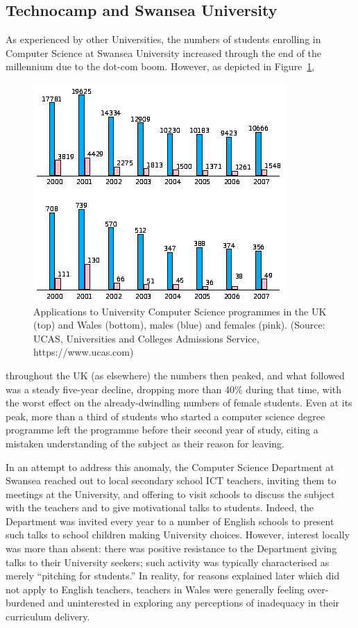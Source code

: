 \documentclass{sig-alternate}
\begin{document}
\subsection{Technocamp and Swansea University}
As experienced by other Universities,
the numbers of students enrolling in Computer Science
at Swansea University increased through the end
of the millennium due to the dot-com boom.
However, as depicted in Figure~\ref{fig:numbers},
\begin{figure}
  \centering
  \includegraphics[width=0.9\columnwidth]{images/numbers.png}
  \caption{Applications to University Computer Science programmes
           in the UK (top) and Wales (bottom), males (blue) and females (pink).
           (Source: UCAS, Universities and Colleges Admissions Service,
            https://www.ucas.com)}
  \label{fig:numbers}
\end{figure}
throughout the UK (as elsewhere) the numbers then peaked, and what followed
was a steady five-year decline, dropping more than 40\% during that time,
with the worst effect on the already-dwindling numbers
of female students.
Even at its peak, more than a third of students who
started a computer science degree programme left
the programme before their second year of study,
citing a mistaken understanding of the subject
as their reason for leaving.

In an attempt to address this anomaly,
the Computer Science Department at Swansea reached out
to local secondary school ICT teachers,
inviting them to meetings at the University,
and offering to visit schools to discuss
the subject with the teachers and to give
motivational talks to students.
Indeed, the Department was invited every year to
a number of English schools to present such talks
to school children making University choices.
However, interest locally was more than absent:
there was positive resistance to the Department
giving talks to their University seekers;
such activity was typically characterised as merely ``pitching for students.''
In reality, for reasons explained later
which did not apply to English teachers,
teachers in Wales were generally feeling over-burdened and
uninterested in exploring any perceptions
of inadequacy in their curriculum delivery.
\end{document}
